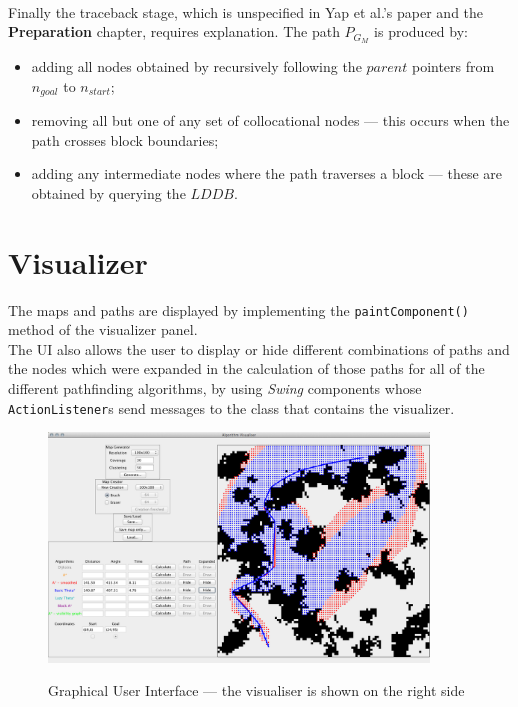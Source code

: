 \documentclass[12pt,notitlepage]{report}
\begin{document}
\\
\noindent
Finally the traceback stage, which is unspecified in Yap et al.'s paper and the {\bfseries Preparation} chapter, requires explanation. The path $P_{G_{M}}$ is produced by:
\begin{itemize}
\item adding all nodes obtained by recursively following the $parent$ pointers from $n_{goal}$ to $n_{start}$;
\item removing all but one of any set of collocational nodes --- this occurs when the path crosses block boundaries;
\item adding any intermediate nodes where the path traverses a block --- these are obtained by querying the $LDDB$.
\end{itemize}
 
\section{Visualizer}

The maps and paths are displayed by implementing the {\tt paintComponent()} method of the visualizer panel.\\

\noindent The UI also allows the user to display or hide different combinations of paths and the nodes which were expanded in the calculation of those paths for all of the different pathfinding algorithms, by using {\em Swing} components whose {\tt ActionListener}s send messages to the class that contains the visualizer.

\begin{figure}
\centering
  {\includegraphics[width=0.9\textwidth]{gui.png}}
  \caption[Graphical user interface]{Graphical User Interface --- the visualiser is shown on the right side} 
\end{figure}
\end{document}
